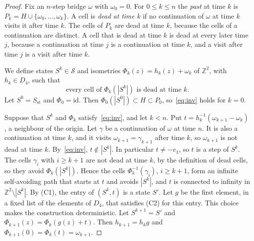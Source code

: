 \documentclass[11pt]{amsart}
\theoremstyle{definition}
\theoremstyle{remark}
\numberwithin{equation}{section}
\newcommand{\Z}{\mathbb{Z}}
\begin{document}
\begin{proof}
Fix an $n$-step bridge $\omega$ with $\omega_0=0$. For $0\le k\le n$ the \emph{past} at time $k$ is $P_k=H\cup\{\omega_0,\dots,\omega_k\}$. A cell is \emph{dead at time $k$} if no continuation of $\omega$ at time $k$ visits it after time $k$. The cells of $P_k$ are dead at time $k$, because the cells of a continuation are distinct. A cell that is dead at time $k$ is dead at every later time $j$, because a continuation at time $j$ is a continuation at time $k$, and a visit after time $j$ is a visit after time $k$.

We define states $S^k\in\mathcal S$ and isometries $\Phi_k(z)=h_k(z)+\omega_k$ of $\Z^2$, with $h_k\in D_4$, such that
\begin{equation}\label{eq:inv}
\text{every cell of }\Phi_k(|S^k|)\text{ is dead at time }k.
\end{equation}
Let $S^0=S_\mathrm{st}$ and $\Phi_0=\mathrm{id}$. Then $\Phi_0(|S^0|)\subset H\subset P_0$, so~\eqref{eq:inv} holds for $k=0$.

Suppose that $S^k$ and $\Phi_k$ satisfy~\eqref{eq:inv}, and let $k<n$. Put $t=h_k^{-1}(\omega_{k+1}-\omega_k)$, a neighbour of the origin. Let $\gamma$ be a continuation of $\omega$ at time $n$. It is also a continuation at time $k$, and it visits $\omega_{k+1}=\gamma_{k+1}$ after time $k$, so $\omega_{k+1}$ is not dead at time $k$. By~\eqref{eq:inv}, $t\notin|S^k|$. In particular $t\ne-e_1$, so $t$ is a step of $S^k$. The cells $\gamma_i$ with $i\ge k+1$ are not dead at time $k$, by the definition of dead cells, so they avoid $\Phi_k(|S^k|)$. Hence the cells $\Phi_k^{-1}(\gamma_i)$, $i\ge k+1$, form an infinite self-avoiding path that starts at $t$ and avoids $|S^k|$, and $t$ is connected to infinity in $\Z^2\setminus|S^k|$. By (C1), the entry of $(S^k,t)$ is a state $S'$. Let $g$ be the first element, in a fixed list of the elements of $D_4$, that satisfies (C2) for this entry. This choice makes the construction deterministic. Let $S^{k+1}=S'$ and $\Phi_{k+1}(z)=\Phi_k(g(z)+t)$. Then $h_{k+1}=h_kg$ and $\Phi_{k+1}(0)=\Phi_k(t)=\omega_{k+1}$.


\end{proof}
\end{document}
